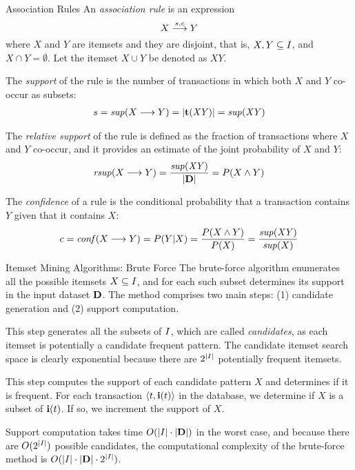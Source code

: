 \begin{frame}{Association Rules}
An {\it association rule}
is an expression 
$$X \arule{s,c} Y$$
where $X$ and $Y$ are itemsets and they are disjoint, that is,
$X,Y \subseteq {\relax I}$, and $X \cap Y = \emptyset$.
Let the itemset $X \cup Y$ be denoted as $\mathit{XY}$.

\smallskip
The
{\em support}
of the rule is the number of transactions in which
both $X$ and $Y$ co-occur as subsets:
\begin{align*}
  s = \supp(X \arule Y) = \card{\vT(\mathit{XY})} = \supp(\mathit{XY})
\end{align*}

\smallskip
The {\em relative support} of the rule is def\/{i}ned as the fraction of transactions
where $X$ and $Y$ co-occur, and it provides an estimate of the joint probability of $X$ and $Y$:
\begin{align*}
  \rsupp(X \arule Y) =  \frac{\supp(\mathit{XY})}{\card{\bD}} =
  P(X \wedge Y)
\end{align*}

\smallskip
The {\em conf\/{i}dence}
of a rule is the conditional probability
that a transaction contains $Y$ given that it contains $X$:
\begin{align*}
c = \conff(X \arule Y) = P(Y|X) =
\frac{P(X \wedge Y)}{P(X)} =
 \frac{\supp (\mathit{XY})}{\supp (X)}
\end{align*}

\end{frame}



\begin{frame}{Itemset Mining Algorithms: Brute Force}
\small
The brute-force
algorithm enumerates all the
possible itemsets $X \subseteq {\relax I}$, and for each such subset determines
its support in the input dataset $\mathbf{D}$. The method comprises two main
steps: (1) candidate generation and (2) support
computation.

This step generates all the subsets of
${\relax I}$, which are called {\em candidates}, as each itemset is
potentially a candidate frequent pattern. The candidate itemset search
space is clearly exponential because there are $2^{|{\relax I}|}$
potentially frequent itemsets.   


This step computes the support of each
candidate pattern $X$ and determines if it is frequent.
For each transaction
$\langle t, {\mathbf{i}}(t) \rangle$ in the database, we determine if $X$ is a
subset of ${\mathbf{i}}(t)$. If so, we increment the support of $X$.


Support computation takes time $O(|{\relax I}| \cdot | \mathbf{D} |)$ in the worst
case, and because there are $O(2^{|{\relax I}|})$ possible candidates,
the computational complexity of the brute-force method is
$O(|{\relax I}|\cdot|\mathbf{D}|\cdot2^{|{\relax I}|})$.

\end{frame}


